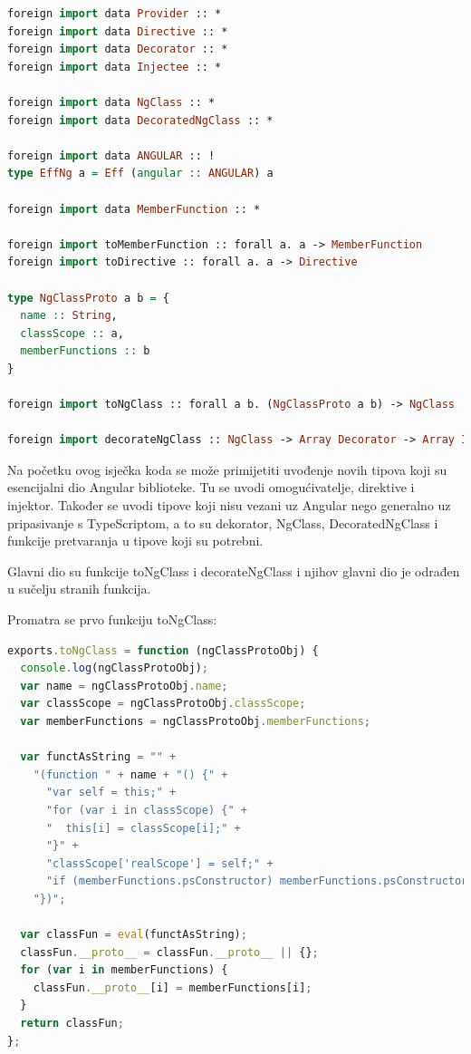\documentclass[times, utf8, zavrsni]{fer}
\begin{document}
\begin{lstlisting}[language=PureScript, basicstyle=\small\linespread{0.8}]
foreign import data Provider :: *
foreign import data Directive :: *
foreign import data Decorator :: *
foreign import data Injectee :: *

foreign import data NgClass :: *
foreign import data DecoratedNgClass :: *

foreign import data ANGULAR :: !
type EffNg a = Eff (angular :: ANGULAR) a

foreign import data MemberFunction :: *

foreign import toMemberFunction :: forall a. a -> MemberFunction
foreign import toDirective :: forall a. a -> Directive

type NgClassProto a b = {
  name :: String,
  classScope :: a,
  memberFunctions :: b
}

foreign import toNgClass :: forall a b. (NgClassProto a b) -> NgClass

foreign import decorateNgClass :: NgClass -> Array Decorator -> Array Injectee -> DecoratedNgClass
\end{lstlisting}

Na početku ovog isječka koda se može primijetiti uvođenje novih tipova koji su esencijalni dio Angular biblioteke. Tu se uvodi omogućivatelje, direktive i injektor. Također se uvodi tipove koji nisu vezani uz Angular nego generalno uz pripasivanje s TypeScriptom, a to su dekorator, NgClass, DecoratedNgClass i funkcije pretvaranja u tipove koji su potrebni.

Glavni dio su funkcije toNgClass i decorateNgClass i njihov glavni dio je odrađen u sučelju stranih funkcija.

Promatra se prvo funkciju toNgClass:

\begin{lstlisting}[language=JavaScript, basicstyle=\small\linespread{0.8}]
exports.toNgClass = function (ngClassProtoObj) {
  console.log(ngClassProtoObj);
  var name = ngClassProtoObj.name;
  var classScope = ngClassProtoObj.classScope;
  var memberFunctions = ngClassProtoObj.memberFunctions;

  var functAsString = "" +
    "(function " + name + "() {" +
      "var self = this;" +
      "for (var i in classScope) {" +
      "  this[i] = classScope[i];" +
      "}" +
      "classScope['realScope'] = self;" +
      "if (memberFunctions.psConstructor) memberFunctions.psConstructor(this);" +
    "})";

  var classFun = eval(functAsString);
  classFun.__proto__ = classFun.__proto__ || {};
  for (var i in memberFunctions) {
    classFun.__proto__[i] = memberFunctions[i];
  }
  return classFun;
};
\end{lstlisting}
\end{document}
